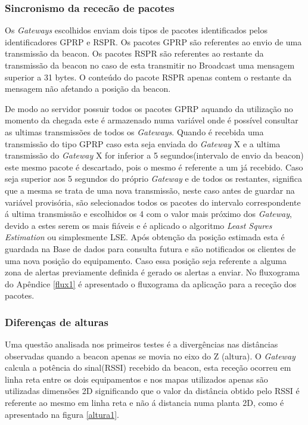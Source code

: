 \subsubsection{Sincronismo da rececão de pacotes}
\par Os \textit{Gateways} escolhidos enviam dois tipos de pacotes identificados pelos identificadores GPRP e RSPR. Os pacotes GPRP são referentes ao envio de uma transmissão da beacon. Os pacotes RSPR são referentes ao restante da transmissão da beacon no caso de esta transmitir no Broadcast uma mensagem superior a 31 bytes. O conteúdo do pacote RSPR apenas contem o restante da mensagem não afetando a posição da beacon.
\par De modo ao servidor possuir todos os pacotes GPRP aquando da utilização no momento da chegada este é armazenado numa variável onde é possível consultar as ultimas transmissões de todos os \textit{Gateways}. Quando é recebida uma transmissão do tipo GPRP caso esta seja enviada do \textit{Gateway} X e a ultima transmissão do \textit{Gateway} X for inferior a 5 segundos(intervalo de envio da beacon) este mesmo pacote é descartado, pois o mesmo é referente a um já recebido. Caso seja superior aos 5 segundos do próprio \textit{Gateway} e de todos os restantes, significa que a mesma se trata de uma nova transmissão, neste caso antes de guardar na variável provisória, são selecionados todos os pacotes do intervalo correspondente á ultima transmissão e escolhidos os 4 com o valor mais próximo dos \textit{Gateway}, devido a estes serem os mais fiáveis e é aplicado o algoritmo \textit{Least Squres Estimation} ou simplesmente LSE. Após obtenção da posição estimada esta é guardada na Base de dados para consulta futura e são notificados os clientes de uma nova posição do equipamento. Caso essa posição seja referente a alguma zona de alertas previamente definida é gerado os alertas a enviar. No fluxograma do Apêndice \ref{flux1} é apresentado o fluxograma da aplicação para a receção dos pacotes.


\subsubsection{Diferenças de alturas}

\par Uma questão analisada nos primeiros testes é a divergências nas distâncias observadas quando a beacon apenas se movia no eixo do Z (altura). O \textit{Gateway} calcula a potência do sinal(RSSI) recebido da beacon, esta receção ocorreu em linha reta entre os dois equipamentos e nos mapas utilizados apenas são utilizadas dimensões 2D significando que o valor da distância obtido pelo RSSI é referente ao mesmo em linha reta e não á distancia numa planta 2D, como é apresentado na figura \ref{altura1}.


